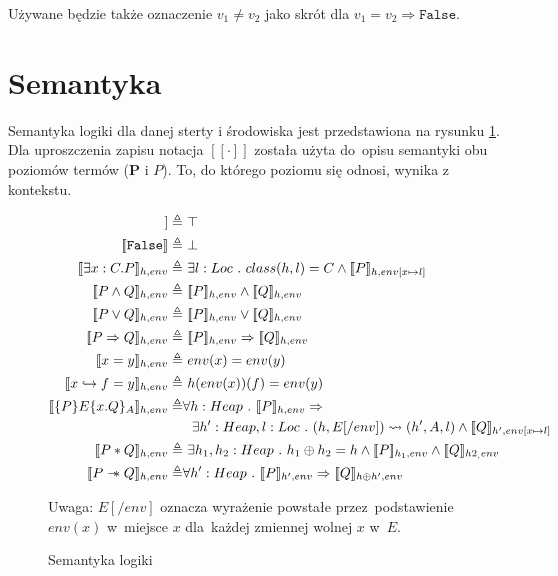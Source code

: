 \documentclass[]{pracamgr}
\newcommand \wand {\mathrel{-\mkern-6mu*}}
\newcommand \outerP {\mathbf{P}}
\newcommand \hoare [5] {\{#1\}#2\{#4.#5\}_#3}
\renewcommand \| {\hspace{0.75em} | \hspace{0.75em} }
\renewcommand \[ {[\![}
\renewcommand \] {]\!]}
\theoremstyle{definition}
\begin{document}
Używane będzie także oznaczenie $v_1 \neq v_2$ jako skrót dla $v_1 = v_2 \Rightarrow \mathtt{False}$.

\section{Semantyka}

Semantyka logiki dla danej sterty i środowiska jest przedstawiona na rysunku \ref{fig:sematics}.
Dla uproszczenia zapisu notacja $\[ \cdot \]$ została użyta do~opisu semantyki obu poziomów termów
($\outerP$ i $P$). To, do którego poziomu się odnosi, wynika z kontekstu.

\begin{figure}[H]
\begin{align*}
 \[ \texttt{True} \] \triangleq & \ \top \\
 \[ \texttt{False} \] \triangleq & \ \bot \\
 \[ \exists x : C . P \]_{h, env} \triangleq & \ \exists l : Loc\ .\ class(h, l) = C \wedge
    \[ P \]_{h, env[x \mapsto l]}  \\
 \[ P \wedge Q \]_{h, env} \triangleq & \ \[ P \]_{h, env} \wedge \[ Q \]_{h, env} \\
 \[ P \vee Q \]_{h, env} \triangleq & \ \[ P \]_{h, env} \vee \[ Q \]_{h, env} \\
 \[ P \Rightarrow Q \]_{h, env} \triangleq & \ \[ P \]_{h, env} \Rightarrow \[ Q \]_{h, env} \\
 \[ x = y \]_{h, env} \triangleq & \ env(x) = env(y) \\
 \[ x \hookrightarrow f = y \]_{h, env} \triangleq & \ h(env(x))(f) = env(y) \\
 \[ \hoare{P}{E}{A}{x}{Q} \]_{h, env} \triangleq & \forall h : Heap \ . \ \[ P \]_{h, env} \Rightarrow \\
      & \ \  \exists h' : Heap, l : Loc \ . \ (h, E[/env]) \leadsto (h', A, l) \wedge
      \[ Q \]_{h', env[x \mapsto l]}  \\
 \[ P * Q \]_{h, env} \triangleq & \ \exists h_1,h_2 : Heap\ .\ h_1 \oplus h_2 = h \wedge
    \[ P \]_{h_1, env} \wedge \[ Q \]_{h2_, env}  \\
 \[ P \wand Q \]_{h, env} \triangleq & \forall h' : Heap \ . \ \[ P \]_{h', env} \Rightarrow \[ Q \]_{h \oplus h', env}
\end{align*}

Uwaga: $E[/env]$ oznacza wyrażenie powstałe przez~podstawienie $env(x)$ w~miejsce $x$ dla~każdej zmiennej
wolnej $x$ w~$E$.

\caption{Semantyka logiki}
\label{fig:sematics}
\end{figure}
\end{document}
